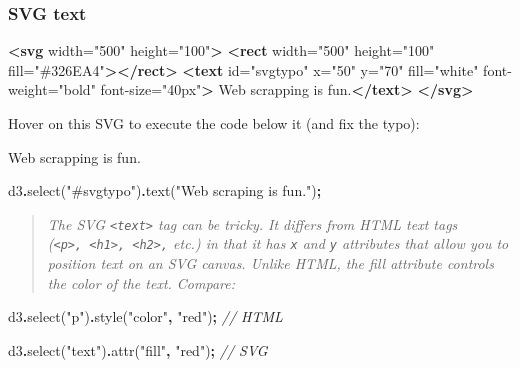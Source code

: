 \documentclass[
  openany]{book}
\newenvironment{Shaded}{\begin{snugshade}}{\end{snugshade}}
\newcommand{\CommentTok}[1]{\textcolor[rgb]{0.56,0.35,0.01}{\textit{#1}}}
\newcommand{\FunctionTok}[1]{\textcolor[rgb]{0.00,0.00,0.00}{#1}}
\newcommand{\KeywordTok}[1]{\textcolor[rgb]{0.13,0.29,0.53}{\textbf{#1}}}
\newcommand{\NormalTok}[1]{#1}
\newcommand{\OperatorTok}[1]{\textcolor[rgb]{0.81,0.36,0.00}{\textbf{#1}}}
\newcommand{\OtherTok}[1]{\textcolor[rgb]{0.56,0.35,0.01}{#1}}
\newcommand{\StringTok}[1]{\textcolor[rgb]{0.31,0.60,0.02}{#1}}
\begin{document}
\hypertarget{svg-text}{%
\subsubsection*{SVG text}\label{svg-text}}

\begin{Shaded}
\begin{Highlighting}[]
\KeywordTok{\textless{}svg}\OtherTok{ width=}\StringTok{"500"}\OtherTok{ height=}\StringTok{"100"}\KeywordTok{\textgreater{}}
  \KeywordTok{\textless{}rect}\OtherTok{ width=}\StringTok{"500"}\OtherTok{ height=}\StringTok{"100"}\OtherTok{ fill=}\StringTok{"\#326EA4"}\KeywordTok{\textgreater{}\textless{}/rect\textgreater{}}
  \KeywordTok{\textless{}text}\OtherTok{ id=}\StringTok{"svgtypo"}\OtherTok{ x=}\StringTok{"50"}\OtherTok{ y=}\StringTok{"70"}\OtherTok{ fill=}\StringTok{"white"}\OtherTok{ font{-}weight=}\StringTok{"bold"}\OtherTok{ font{-}size=}\StringTok{"40px"}\KeywordTok{\textgreater{}}
\NormalTok{     Web scrapping is fun.}\KeywordTok{\textless{}/text\textgreater{}}
\KeywordTok{\textless{}/svg\textgreater{}}  
\end{Highlighting}
\end{Shaded}

Hover on this SVG to execute the code below it (and fix the typo):

Web scrapping is fun.

\hypertarget{fixsvgtypo}{}
\begin{Shaded}
\begin{Highlighting}[]
\NormalTok{d3}\OperatorTok{.}\FunctionTok{select}\NormalTok{(}\StringTok{"\#svgtypo"}\NormalTok{)}\OperatorTok{.}\FunctionTok{text}\NormalTok{(}\StringTok{"Web scraping is fun."}\NormalTok{)}\OperatorTok{;}
\end{Highlighting}
\end{Shaded}

\begin{quote}
\emph{The SVG \texttt{\textless{}text\textgreater{}} tag can be tricky. It differs from HTML text tags (\texttt{\textless{}p\textgreater{},\ \textless{}h1\textgreater{},\ \textless{}h2\textgreater{},} etc.) in that it has \texttt{x} and \texttt{y} attributes that allow you to position text on an SVG canvas. Unlike HTML, the fill attribute controls the color of the text. Compare:}
\end{quote}

\begin{Shaded}
\begin{Highlighting}[]
\NormalTok{d3}\OperatorTok{.}\FunctionTok{select}\NormalTok{(}\StringTok{"p"}\NormalTok{)}\OperatorTok{.}\FunctionTok{style}\NormalTok{(}\StringTok{"color"}\OperatorTok{,} \StringTok{"red"}\NormalTok{)}\OperatorTok{;}   \CommentTok{// HTML}

\NormalTok{d3}\OperatorTok{.}\FunctionTok{select}\NormalTok{(}\StringTok{"text"}\NormalTok{)}\OperatorTok{.}\FunctionTok{attr}\NormalTok{(}\StringTok{"fill"}\OperatorTok{,} \StringTok{"red"}\NormalTok{)}\OperatorTok{;}  \CommentTok{// SVG}
\end{Highlighting}
\end{Shaded}
\end{document}
